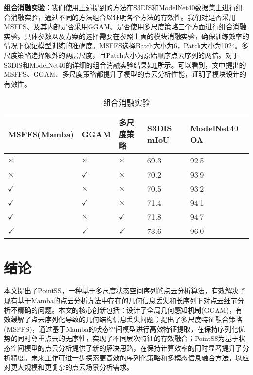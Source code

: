 \documentclass[preprint,12pt]{elsarticle}
\begin{document}
\textbf{组合消融实验：}我们使用上述提到的方法在S3DIS和ModelNet40数据集上进行组合消融实验，通过不同的方法组合以证明各个方法的有效性。我们对是否采用MSFFS、及其内部是否采用GGAM、是否使用多尺度策略三个方面进行组合消融实验。具体参数以及方案的选择需要在参照上面的模块消融实验，确保训练效率的情况下保证模型训练的准确度。MSFFS选择Batch大小为6，Patch大小为1024。多尺度策略选择额外的两层尺度，且Patch大小为原始顺序点云序列的两倍。对于S3DIS和ModelNet40的详细的组合消融实验结果如\cref{tab:combine}所示。可以看到，文中提出的MSFFS、GGAM、多尺度策略都提升了模型的点云分析性能，证明了模块设计的有效性。
\begin{table}[htbp!]
	\centering
	\caption{组合消融实验}
	\label{tab:combine}
	\begin{tabular}{@{}lllll@{}}
		\toprule
		MSFFS(Mamba) & GGAM & 多尺度策略 & S3DIS mIoU & ModelNet40 OA \\
		\midrule
		$\times$        & $\times$        & $\times$        & 69.3         & 92.5          \\
		$\times$        & $\checkmark$    & $\times$        & 70.2         & 93.9          \\
		$\checkmark$    & $\times$        & $\times$        & 70.5         & 93.2          \\
		$\checkmark$    & $\checkmark$    & $\times$        & 71.4         & 94.1          \\
		$\checkmark$    & $\times$        & $\checkmark$    & 71.8         & 94.7          \\
		$\checkmark$    & $\checkmark$    & $\checkmark$    & 73.6         & 96.0          \\
		\bottomrule
	\end{tabular}
\end{table}
\section{结论}
本文提出了PointSS，一种基于多尺度状态空间序列的点云分析算法，有效解决了现有基于Mamba的点云分析方法中存在的几何信息丢失和长序列下对点云细节分析不精确的问题。本文的核心创新包括：设计了全局几何感知机制(GGAM)，有效缓解了点云序列化导致的几何结构信息丢失问题；提出了多尺度特征融合策略(MSFFS)，通过基于Mamba的状态空间模型进行高效特征提取，在保持序列化优势的同时尊重点云的无序性，实现了不同层次特征的有效融合；PointSS为基于状态空间模型的点云分析提供了新的解决思路，在保持计算效率的同时显著提升了分析精度。未来工作可进一步探索更高效的序列化策略和多模态信息融合方法，以应对更大规模和更复杂的点云场景分析需求。
\end{document}
